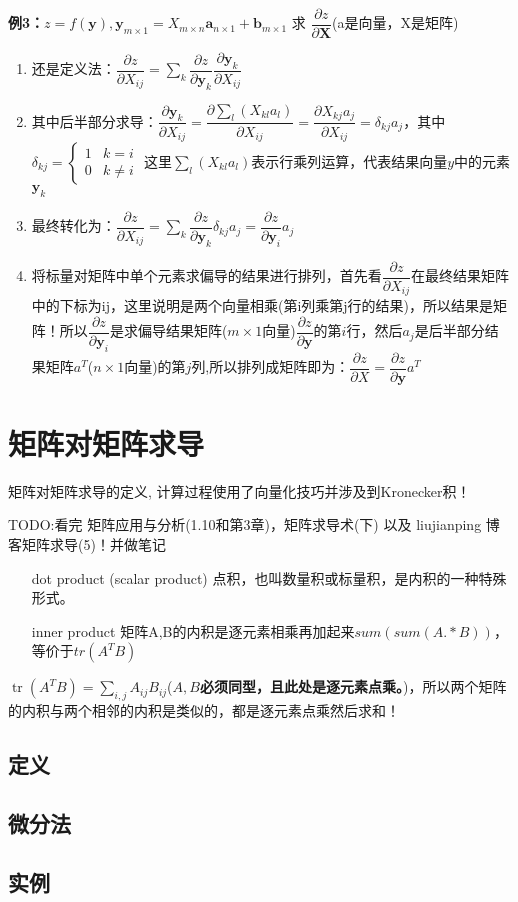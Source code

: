 \documentclass[UTF8]{article}
\begin{document}
    \textbf{例3：}$z=f(\mathbf{y}), \mathbf{y}_{m \times 1}=X_{m\times n} \mathbf{a}_{n\times 1}+\mathbf{b}_{m\times 1}$ 求 $\dfrac{\partial z}{\partial \mathbf{X}}$(a是向量，X是矩阵)
    \begin{enumerate}
        \item 还是定义法：$\dfrac{\partial z}{\partial X_{i j}}=\sum_{k} \dfrac{\partial z}{\partial \bm{y}_{k}} \dfrac{\partial \bm{y}_{k}}{\partial X_{i j}}$
        \item 其中后半部分求导：$\dfrac{\partial \bm{y}_{k}}{\partial X_{i j}} = \dfrac{\partial \sum_{l}\left(X_{k l} a_{l}\right)}{\partial X_{i j}}=\dfrac{\partial X_{k j} a_{j}}{\partial X_{i j}}=\delta_{k j} a_{j}$，其中$\delta_{kj}=\left\{\begin{array}{ll}1 & k=i \\ 0 & k \neq i\end{array}\right.$ 这里$\sum_{l}(X_{k l} a_{l})$表示行乘列运算，代表结果向量$y$中的元素$\bm{y}_{k}$
        \item 最终转化为：$\dfrac{\partial z}{\partial X_{i j}}=\sum_{k} \dfrac{\partial z}{\partial \bm{y}_{k}} \delta_{k j} a_{j} =\dfrac{\partial z}{\partial \bm{y}_{i}} a_{j}$
        \item 将标量对矩阵中单个元素求偏导的结果进行排列，首先看$\dfrac{\partial z}{\partial X_{ij}}$在最终结果矩阵中的下标为ij，这里说明是两个向量相乘(第i列乘第j行的结果)，所以结果是矩阵！所以$\dfrac{\partial z}{\partial \bm{y}_{i}}$是求偏导结果矩阵($m\times 1$向量)$\dfrac{\partial z}{\partial \bm{y}}$的第$i$行，然后$a_{j}$是后半部分结果矩阵$a^T$($n\times 1$向量)的第$j$列,所以排列成矩阵即为：$\dfrac{\partial z}{\partial X}=\dfrac{\partial z}{\partial \bm{y}}a^{T} $
    \end{enumerate}


    \section{矩阵对矩阵求导}
    矩阵对矩阵求导的定义, 计算过程使用了向量化技巧并涉及到Kronecker积！


    TODO:看完 矩阵应用与分析(1.10和第3章)，矩阵求导术(下) 以及 liujianping 博客矩阵求导(5)！并做笔记
    \\
    \begin{itemize}
        \item[dot product] (scalar product) 点积，也叫数量积或标量积，是内积的一种特殊形式。
        \item[inner product] 矩阵A,B的内积是逐元素相乘再加起来$sum(sum(A.*B))$，等价于$tr(A^T B)$
    \end{itemize}
    $\operatorname{tr}\left(A^{T} B\right)=\sum_{i, j} A_{i j} B_{i j}$(\textbf{$A, B$必须同型，且此处是逐元素点乘。})，所以两个矩阵的内积与两个相邻的内积是类似的，都是逐元素点乘然后求和！
    \subsection{定义}
    \subsection{微分法}
    \subsection{实例}
\end{document}
